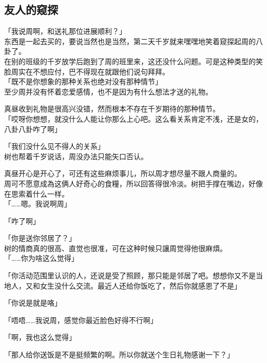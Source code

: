 \subsection{友人的窥探}

「我说周啊，和送礼那位进展顺利？」\\

东西是一起去买的，要说当然也是当然，第二天千岁就来嘿嘿地笑着窥探起周的八卦了。\\

在别的班级的千岁放学后跑到了周的班里来，这还没什么问题。可是这种类型的笑脸周实在不想应付，巴不得现在就跟他们说句拜拜。\\

「既不是你想象的那种关系也绝对没有那种情节」\\%

至少周并没有怀着恋爱感情，也不是因为有什么想法才送的礼物。

真昼收到礼物是很高兴没错，然而根本不存在千岁期待的那种情节。\\

「哎呀你想想，就没什么人能让你那么上心吧。这么看关系肯定不浅，还是女的，八卦八卦咋了啊」

「我们没什么见不得人的关系」\\

树也帮着千岁说话，周没办法只能矢口否认。

真昼开心是开心了，可还有这些麻烦事儿，所以周才想尽量不跟人商量的。\\

周可不愿意成為这俩人好奇心的食糧，所以回答得很冷淡。树把手撑在嘴边，好像在思索着什么一样。\\

「……嗯。我说啊周」

「咋了啊」

「你是送你邻居了？」\\

树的情商真的很高、直觉也很准，可在这种时候只讓周觉得他很麻煩。\\

「……你为啥这么觉得」

「你活动范围里认识的人，还说是受了照顾，那只能是邻居了吧。想想你又不是当地人，又和女生没什么交流。最近人还给你饭吃了，然后你就感恩了不是」

「你说是就是咯」

「唔唔……我说周，感觉你最近脸色好得不行啊」

「啊，我也这么觉得」

「那人给你送饭是不是挺频繁的啊。所以你就送个生日礼物感谢一下？」\\

